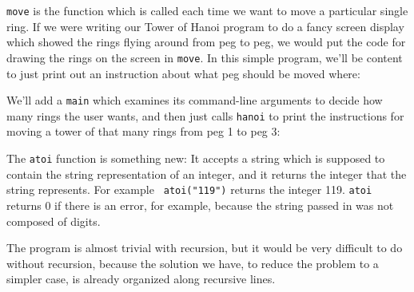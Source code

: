 {\tt move} is the function which is called each time we want to move a
particular single ring.  If we were writing our Tower of Hanoi program
to do a fancy screen display which showed the rings flying around from
peg to peg, we would put the code for drawing the rings on the screen in
{\tt move}.  In this simple program, we'll be content to just print out
an instruction about what peg should be moved where:

\begin{flushleft}
\verb%void move(int ring_num, int start, int end)%
\\* \verb%{%
\\* \verb%  printf("Move disk %\verb-%-\verb%d from peg %\verb-%-\verb%d onto peg %\verb-%-\verb%d.\n", %
\\* \verb%         ring_num, start, end);%

\verb%  return;%
\\* \verb%}%
\end{flushleft}

We'll add a {\tt main} which examines its command-line arguments
to decide how many rings the user wants, and then just calls {\tt hanoi}
to print the instructions for moving a tower of that many rings from peg
1 to peg 3:

\begin{flushleft}
\verb%void hanoi(int num_rings, int start_peg, int end_peg);%
\\* \verb%void move(int ring_num, int start, int end);%
\end{flushleft}

\begin{flushleft}
\verb%int main(int argc, char **argv)%
\\* \verb%{%
\\* \verb%  int num_rings;%

\verb%  if (argc != 2) {%
\\* \verb%    fprintf(stderr, "Usage: %\verb-%-\verb%s number_of_rings\n", argv[0]);%
\\* \verb%    return 1;%
\\* \verb%  }%

\verb%  num_rings = atoi(argv[1]);%

\verb%  hanoi(num_rings, 1, 3);%

\verb%  return 0;%
\\* \verb%}%
\end{flushleft}

    The {\tt atoi} function is something new: It accepts a string which
is supposed to contain the string representation of an integer, and it
returns the integer that the string represents.  For example {\tt
atoi("119")} returns the integer 119.  {\tt atoi} returns 0 if there is
an error, for example, because the string passed in was not composed of
digits.

The program is almost trivial with recursion, but it would be very
difficult to do without recursion, because the solution we have, to
reduce the problem to a simpler case, is already organized along
recursive lines.

